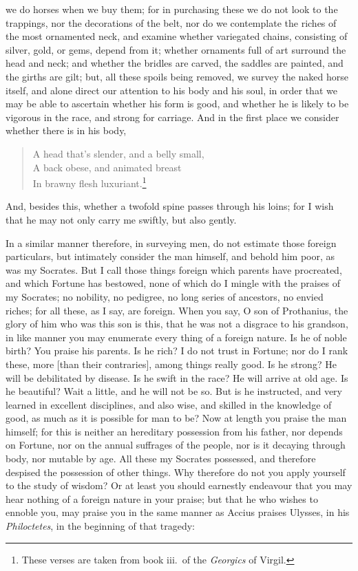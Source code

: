 \documentclass[twoside]{article}
\begin{document}
we do horses when we buy them; for in purchasing these we do not look to the
trappings, nor the decorations of the belt, nor do we contemplate the riches of
the most ornamented neck, and examine whether variegated chains, consisting of
silver, gold, or gems, depend from it; whether ornaments full of art surround
the head and neck; and whether the bridles are carved, the saddles are painted,
and the girths are gilt; but, all these spoils being removed, we survey the
naked horse itself, and alone direct our attention to his body and his soul, in
order that we may be able to ascertain whether his form is good, and whether he
is likely to be vigorous in the race, and strong for carriage. And in the first
place we consider whether there is in his body,

\begin{verse}
A head that's slender, and a belly small,\\
A back obese, and animated breast\\
In brawny flesh luxuriant.\footnote{These verses are taken from book iii.~of
the \textit{Georgics} of Virgil.}
\end{verse}

\noindent And, besides this, whether a twofold spine passes through his loins;
for I wish that he may not only carry me swiftly, but also gently.

In a similar manner therefore, in surveying men, do not estimate those foreign
particulars, but intimately consider the man himself, and behold him poor, as
was my Socrates. But I call those things foreign which parents have procreated,
and which Fortune has bestowed, none of which do I mingle with the praises of
my Socrates; no nobility, no pedigree, no long series of ancestors, no envied
riches; for all these, as I say, are foreign. When you say, O son of
Prothanius, the glory of him who was this son is this, that he was not a
disgrace to his grandson, in like manner you may enumerate every thing of a
foreign nature. Is he of noble birth? You praise his parents. Is he rich? I do
not trust in Fortune; nor do I rank these, more [than their contraries], among
things really good. Is he strong? He will be debilitated by disease. Is he
swift in the race? He will arrive at old age. Is he beautiful? Wait a little,
and he will not be so. But is he instructed, and very learned in excellent
disciplines, and also wise, and skilled in the knowledge of good, as much as it
is possible for man to be? Now at length you praise the man himself; for this
is neither an hereditary possession from his father, nor depends on Fortune,
nor on the annual suffrages of the people, nor is it decaying through body, nor
mutable by age. All these my Socrates possessed, and therefore despised the
possession of other things. Why therefore do not you apply yourself to the
study of wisdom? Or at least you should earnestly endeavour that you may hear
nothing of a foreign nature in your praise; but that he who wishes to ennoble
you, may praise you in the same manner as Accius praises Ulysses, in his
\textit{Philoctetes}, in the beginning of that tragedy:
\end{document}
